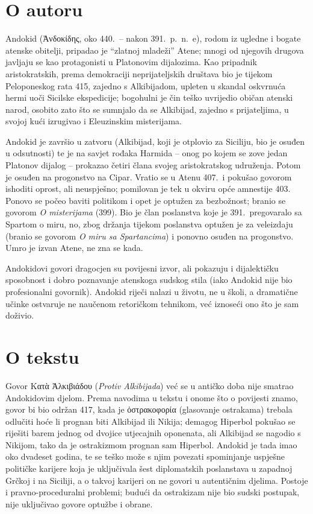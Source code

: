 \section*{O autoru}

Andokid (Ἀνδοκίδης, oko 440.\ – nakon 391.\ p.~n.~e), rodom iz ugledne i bogate atenske obitelji, pripadao je ``zlatnoj mladeži'' Atene; mnogi od njegovih drugova javljaju se kao protagonisti u Platonovim dijalozima. Kao pripadnik aristokratskih, prema demokraciji neprijateljskih društava bio je tijekom Peloponeskog rata 415, zajedno s Alkibijadom, upleten u skandal oskvrnuća hermi uoči Sicilske ekspedicije; bogohulni je čin teško uvrijedio običan atenski narod, osobito zato što se sumnjalo da se Alkibijad, zajedno s prijateljima, u svojoj kući izrugivao i Eleuzinskim misterijama.

Andokid je završio u zatvoru (Alkibijad, koji je otplovio za Siciliju, bio je osuđen u odsutnosti) te je na savjet rođaka Harmida – onog po kojem se zove jedan Platonov dijalog – prokazao četiri člana svojeg aristokratskog udruženja. Potom je osuđen na progonstvo na Cipar. Vratio se u Atenu 407.\ i pokušao govorom ishoditi oprost, ali neuspješno; pomilovan je tek u okviru opće amnestije 403. Ponovo se počeo baviti politikom i opet je optužen za bezbožnost; branio se govorom \textit{O misterijama} (399). Bio je član poslanstva koje je 391.\ pregovaralo sa Spartom o miru, no, zbog držanja tijekom poslanstva optužen je za veleizdaju (branio se govorom \textit{O miru sa Spartancima}) i ponovno osuđen na progonstvo. Umro je izvan Atene, ne zna se kada.

Andokidovi govori dragocjen su povijesni izvor, ali pokazuju i dijalektičku sposobnost i dobro poznavanje atenskoga sudskog stila (iako Andokid nije bio profesionalni govornik). Andokid riječi nalazi u životu, ne u školi, a dramatične učinke ostvaruje ne naučenom retoričkom tehnikom, već iznoseći ono što je sam doživio.

\section*{O tekstu}

Govor Κατὰ Ἀλκιβιάδου (\textit{Protiv Alkibijada}) već se u antičko doba nije smatrao Andokidovim djelom. Prema navodima u tekstu i onome što o povijesti znamo, govor bi bio održan 417, kada je ὀστρακοφορία (glasovanje ostrakama) trebala odlučiti hoće li prognan biti Alkibijad ili Nikija; demagog Hiperbol pokušao se riješiti barem jednog od dvojice utjecajnih oponenata, ali Alkibijad se nagodio s Nikijom, tako da je ostrakizmom prognan sam Hiperbol. Andokid je tada imao oko dvadeset godina, te se teško može s njim povezati spominjanje uspješne političke karijere koja je uključivala šest diplomatskih poslanstava u zapadnoj Grčkoj i na Siciliji, a o takvoj karijeri on ne govori u autentičnim djelima. Postoje i pravno-proceduralni problemi; budući da ostrakizam nije bio sudski postupak, nije uključivao govore optužbe i obrane.

